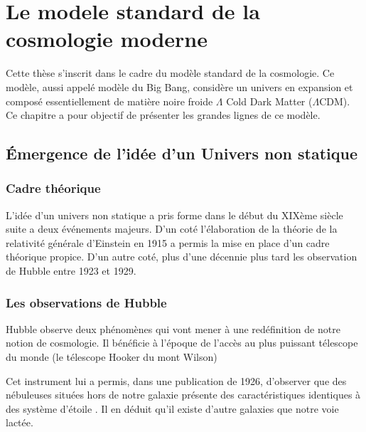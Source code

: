 \chapter{Le modele standard de la cosmologie moderne} \label{ch:introduction_physique}

Cette thèse s'inscrit dans le cadre du modèle standard de la cosmologie.
Ce modèle, aussi appelé modèle du Big Bang, considère un univers en expansion et composé essentiellement de matière noire froide $\Lambda$ Cold Dark Matter ($\Lambda$CDM).
Ce chapitre a pour objectif de présenter les grandes lignes de ce modèle.


\section{Émergence de l'idée d'un Univers non statique}


\subsection{Cadre théorique}

L'idée d'un univers non statique a pris forme dans le début du XIXème siècle suite a deux événements majeurs.
D'un coté l'élaboration de la théorie de la relativité générale d'Einstein en 1915 a permis la mise en place d'un cadre théorique propice.
D'un autre coté, plus d'une décennie plus tard les observation de Hubble entre 1923 et 1929.

\subsection{Les observations de Hubble}

Hubble observe deux phénomènes qui vont mener à une redéfinition de notre notion de cosmologie.
Il bénéficie à l'époque de l'accès au plus puissant télescope du monde (le télescope Hooker du mont Wilson)

Cet instrument lui a permis, dans une publication de 1926, d'observer que des nébuleuses situées hors de notre galaxie présente des caractéristiques identiques à des système d'étoile \citep{1926ApJ....63..236H}.
Il en déduit qu'il existe d'autre galaxies que notre voie lactée.


